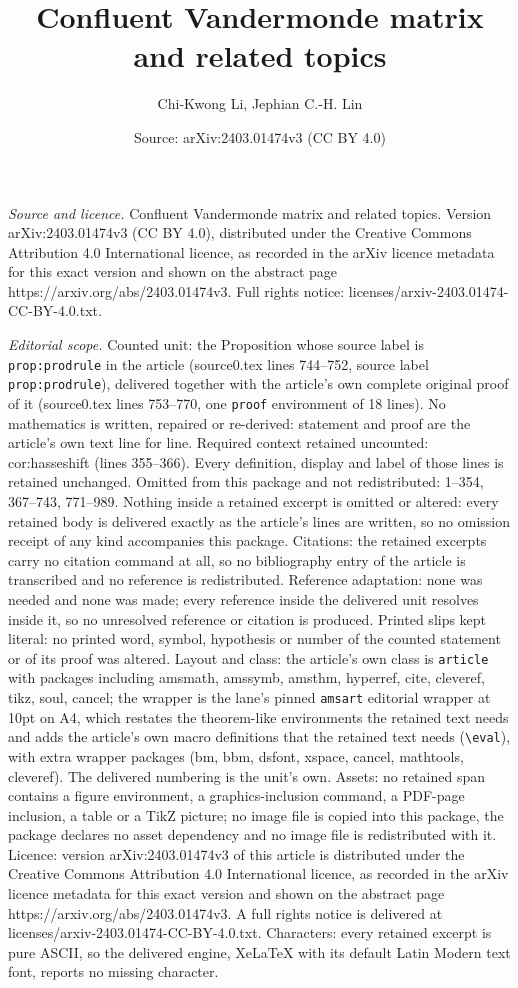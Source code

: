 \documentclass[10pt,a4paper]{amsart}
\title[Confluent Vandermonde matrix and related topics]{Confluent Vandermonde matrix and related topics}
\author{Chi-Kwong Li, Jephian C.-H. Lin}
\date{Source: arXiv:2403.01474v3 (CC BY 4.0)}
\begin{document}
\maketitle

\noindent\emph{Source and licence.} Confluent Vandermonde matrix and related topics. Version arXiv:2403.01474v3 (CC BY 4.0), distributed under the Creative Commons Attribution 4.0 International licence, as recorded in the arXiv licence metadata for this exact version and shown on the abstract page https://arxiv.org/abs/2403.01474v3. Full rights notice: licenses/arxiv-2403.01474-CC-BY-4.0.txt.\par\smallskip

\noindent\textit{Editorial scope.} Counted unit: the Proposition whose source label is \texttt{prop:prodrule} in the article (source0.tex lines 744--752, source label \texttt{prop:prodrule}), delivered together with the article's own complete original proof of it (source0.tex lines 753--770, one \texttt{proof} environment of 18 lines). No mathematics is written, repaired or re-derived: statement and proof are the article's own text line for line. Required context retained uncounted: cor:hasseshift (lines 355--366). Every definition, display and label of those lines is retained unchanged. Omitted from this package and not redistributed: 1--354, 367--743, 771--989. Nothing inside a retained excerpt is omitted or altered: every retained body is delivered exactly as the article's lines are written, so no omission receipt of any kind accompanies this package. Citations: the retained excerpts carry no citation command at all, so no bibliography entry of the article is transcribed and no reference is redistributed. Reference adaptation: none was needed and none was made; every reference inside the delivered unit resolves inside it, so no unresolved reference or citation is produced. Printed slips kept literal: no printed word, symbol, hypothesis or number of the counted statement or of its proof was altered. Layout and class: the article's own class is \texttt{article} with packages including amsmath, amssymb, amsthm, hyperref, cite, cleveref, tikz, soul, cancel; the wrapper is the lane's pinned \texttt{amsart} editorial wrapper at 10pt on A4, which restates the theorem-like environments the retained text needs and adds the article's own macro definitions that the retained text needs (\texttt{\textbackslash eval}), with extra wrapper packages (bm, bbm, dsfont, xspace, cancel, mathtools, cleveref). The delivered numbering is the unit's own. Assets: no retained span contains a figure environment, a graphics-inclusion command, a PDF-page inclusion, a table or a TikZ picture; no image file is copied into this package, the package declares no asset dependency and no image file is redistributed with it. Licence: version arXiv:2403.01474v3 of this article is distributed under the Creative Commons Attribution 4.0 International licence, as recorded in the arXiv licence metadata for this exact version and shown on the abstract page https://arxiv.org/abs/2403.01474v3. A full rights notice is delivered at licenses/arxiv-2403.01474-CC-BY-4.0.txt. Characters: every retained excerpt is pure ASCII, so the delivered engine, XeLaTeX with its default Latin Modern text font, reports no missing character.
\end{document}
